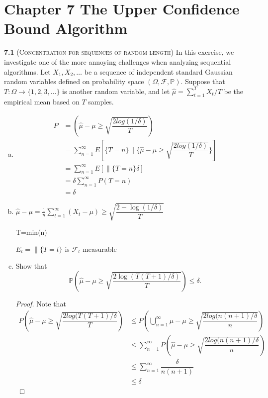 \chapter*{Chapter 7 The Upper Confidence Bound Algorithm}
\label{sec:7}

\noindent\textbf{7.1} (\textsc{Concentration for sequences of random length})
    In this exercise, we investigate one of the more annoying challenges when analyzing sequential algorithms.
    Let $X_{1}, X_{2}, \ldots$ be a sequence of independent standard Gaussian random variables defined on probability space $(\Omega, \mathcal{F}, \mathbb{P})$.
    Suppose that $T: \Omega \rightarrow\{1,2,3, \ldots\}$ is another random variable, and let $\hat{\mu}=\sum_{t=1}^{T} X_{t} / T$ be the empirical mean based on $T$ samples.

    \begin{enumerate}[(a)]
    \item 

    \begin{align*}
    P &=(\hat{\mu}-\mu\ge\sqrt{\dfrac{2log(1/\delta)}{T}})\\
    &=\sum^{\infty}_{n=1}E[\{T=n\}\|\{\hat{\mu}-\mu\ge\sqrt{\dfrac{2log(1/\delta)}{T}}\}]\\
    &=\sum^{\infty}_{n=1}E[\|\{T=n\}\delta]\\
    &=\delta\sum^{\infty}_{n=1}P(T=n)\\
    &=\delta
    \end{align*}

    \item
    $\hat{\mu}-\mu=\frac{1}{n}\sum^{\infty}_{t=1}(X_t-\mu)\ge\sqrt{\dfrac{2-\log(1/\delta)}{T}}$

    T=min(n)

    $E_t=\|\{T=t\}$ is $\mathcal{F}_t$-measurable

    \item Show that
    $$\mathbb{P}\left(\hat{\mu}-\mu \geq \sqrt{\frac{2 \log (T(T+1) / \delta)}{T}}\right) \leq \delta.$$

    \begin{proof}
        Note that
        \begin{align*}
            P(\hat{\mu}-\mu\ge\sqrt{\dfrac{2log(T(T+1)/\delta}{T}}) &\le P(\bigcup^{\infty}_{n=1}\hat{\mu}-\mu\ge\sqrt{\dfrac{2log(n(n+1)/\delta}{n}})\\
            &\le \sum^{\infty}_{n=1}P(\hat{\mu}-\mu\ge\sqrt{\dfrac{2log(n(n+1)/\delta}{n}})\\
            &\le \sum^{\infty}_{n=1} \dfrac{\delta}{n(n+1)}\\
            &\le \delta
        \end{align*}
    \end{proof}


\end{enumerate}
